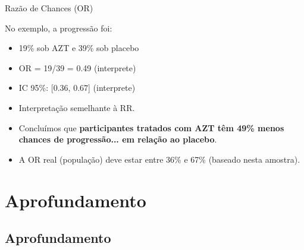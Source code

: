 \documentclass{beamer}
\begin{document}
\begin{frame}{Razão de Chances (OR)}
  \begin{exampleblock}{No exemplo, a progressão foi:}
    \begin{itemize}
    \item 19\% sob AZT e 39\% sob placebo
    \item OR = 19/39 = 0.49 (interprete)
    \item IC 95\%: [0.36, 0.67] (interprete)
    \end{itemize}
  \end{exampleblock}
  \begin{itemize}
  \item Interpretação semelhante à RR.
  \item Concluímos que {\bf participantes tratados com AZT têm 49\% menos chances de progressão... em relação ao placebo}.
  \item A OR real (população) deve estar entre 36\% e 67\% (baseado nesta amostra).
  \end{itemize}
\end{frame}

\section{Aprofundamento}

\subsection{Aprofundamento}
\end{document}
